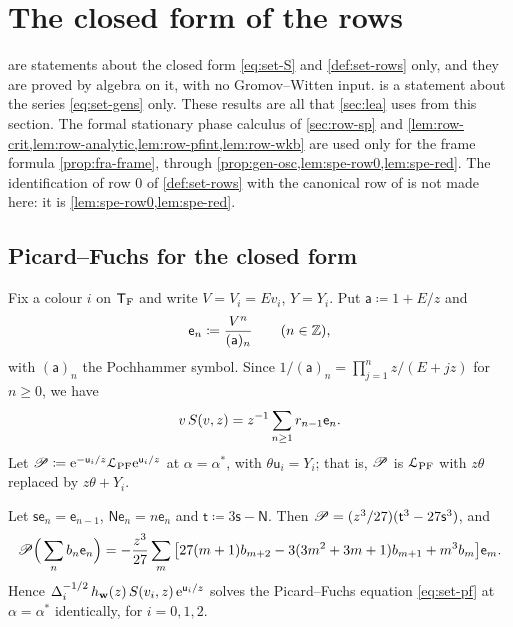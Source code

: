 \section{The closed form of the rows}
\label{sec:row}

 are statements about the closed form \eqref{eq:set-S} and \cref{def:set-rows} only, and they are proved by algebra on it, with no Gromov--Witten input.  is a statement about the series \eqref{eq:set-gens} only. These results are all that \cref{sec:lea} uses from this section. The formal stationary phase calculus of \cref{sec:row-sp} and \cref{lem:row-crit,lem:row-analytic,lem:row-pfint,lem:row-wkb} are used only for the frame formula \cref{prop:fra-frame}, through \cref{prop:gen-osc,lem:spe-row0,lem:spe-red}. The identification of row $0$ of \cref{def:set-rows} with the canonical row of \cite{BS} is not made here: it is \cref{lem:spe-row0,lem:spe-red}.

\subsection{Picard--Fuchs for the closed form}
\label{sec:row-pf}

Fix a colour $i$ on $\mathsf{T}_{\mathrm{F}}$ and write $V=V_i=Ev_i$, $Y=Y_i$. Put $\mathsf{a}\coloneqq1+E/z$ and
\[
\mathsf{e}_n\coloneqq\frac{V^n}{(\mathsf{a})_n}\qquad(n\in\mathbb{Z}),
\]
with $(\mathsf{a})_n$ the Pochhammer symbol. Since $1/(\mathsf{a})_n=\prod_{j=1}^{n}z/(E+jz)$ for $n\geq 0$, we have
\begin{equation}
\label{eq:row-vS}
v\,S(v,z)=z^{-1}\sum_{n\geq1}r_{n-1}\mathsf{e}_n .
\end{equation}
Let $\mathscr{P}\coloneqq\mathrm{e}^{-\mathsf{u}_i/z}\mathcal{L}_{\mathrm{PF}}\mathrm{e}^{\mathsf{u}_i/z}$ at $\alpha=\alpha^*$, with $\theta\mathsf{u}_i=Y_i$; that is, $\mathscr{P}$ is $\mathcal{L}_{\mathrm{PF}}$ with $z\theta$ replaced by $z\theta+Y_i$.

\begin{thm}
\label{thm:row-pf}
Let $\mathsf{s}\mathsf{e}_n=\mathsf{e}_{n-1}$, $\mathsf{N}\mathsf{e}_n=n\mathsf{e}_n$ and $\mathsf{t}\coloneqq3\mathsf{s}-\mathsf{N}$. Then $\mathscr{P}=(z^3/27)(\mathsf{t}^3-27\mathsf{s}^3)$, and
\begin{equation}
\label{eq:row-pfcoef}
\mathscr{P}\Big(\sum_nb_n\mathsf{e}_n\Big)=-\frac{z^3}{27}\sum_m\big[27(m+1)b_{m+2}-3(3m^2+3m+1)b_{m+1}+m^3b_m\big]\mathsf{e}_m .
\end{equation}
Hence $\Delta_i^{-1/2}\,h_{\mathbf{w}}(z)\,S(v_i,z)\,\mathrm{e}^{\mathsf{u}_i/z}$ solves the Picard--Fuchs equation \eqref{eq:set-pf} at $\alpha=\alpha^*$ identically, for $i=0,1,2$.
\end{thm}

